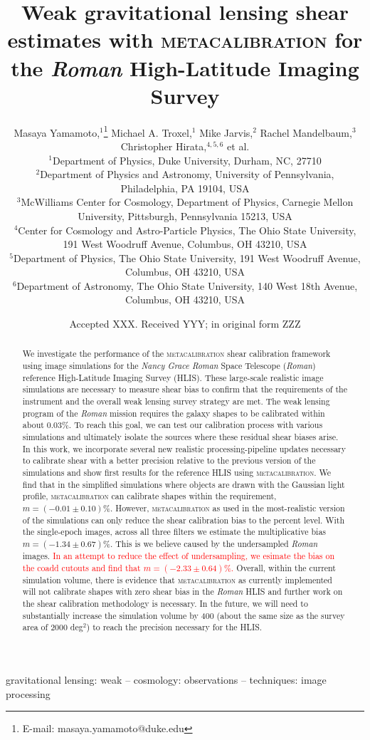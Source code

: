 \documentclass[fleqn,usenatbib]{mnras}
\title[Metacalibration for the Roman High-Latitude Imaging Survey]{Weak gravitational lensing shear estimates with \textsc{metacalibration} for the \emph{Roman} High-Latitude Imaging Survey}
\author[M. Yamamoto et al.]{
Masaya Yamamoto,$^{1}$\thanks{E-mail: masaya.yamamoto@duke.edu}
Michael A. Troxel,$^{1}$
Mike Jarvis,$^{2}$
Rachel Mandelbaum,$^{3}$
Christopher Hirata,$^{4,5,6}$
 et al.\\
$^{1}$Department of Physics, Duke University, Durham, NC, 27710\\
$^{2}$Department of Physics and Astronomy, University of Pennsylvania, Philadelphia, PA 19104, USA\\
$^{3}$McWilliams Center for Cosmology, Department of Physics, Carnegie Mellon University, Pittsburgh, Pennsylvania 15213, USA\\
$^{4}$Center for Cosmology and Astro-Particle Physics, The Ohio State University, 191 West Woodruff Avenue, Columbus, OH 43210, USA\\
$^{5}$Department of Physics, The Ohio State University, 191 West Woodruff Avenue, Columbus, OH 43210, USA\\
$^{6}$Department of Astronomy, The Ohio State University, 140 West 18th Avenue, Columbus, OH 43210, USA\\
}
\date{Accepted XXX. Received YYY; in original form ZZZ}
\begin{document}
\label{firstpage}
\pagerange{\pageref{firstpage}--\pageref{lastpage}}
\maketitle

\begin{abstract}
We investigate the performance of the \textsc{metacalibration} shear calibration framework using image simulations for the \emph{Nancy Grace Roman} Space Telescope (\emph{Roman}) reference High-Latitude Imaging Survey (HLIS). These large-scale realistic image simulations are necessary to measure shear bias to confirm that the requirements of the instrument and the overall weak lensing survey strategy are met. The weak lensing program of the \emph{Roman} mission requires the galaxy shapes to be calibrated within about 0.03\%. To reach this goal, we can test our calibration process with various simulations and ultimately isolate the sources where these residual shear biases arise. In this work, we incorporate several new realistic processing-pipeline updates necessary to calibrate shear with a better precision relative to the previous version of the simulations and show first results for the reference HLIS using \textsc{metacalibration}. We find that in the simplified simulations where objects are drawn with the Gaussian light profile, \textsc{metacalibration} can calibrate shapes within the requirement, $m=(-0.01\pm 0.10)$\%. However, \textsc{metacalibration} as used in the most-realistic version of the simulations can only reduce the shear calibration bias to the percent level. With the single-epoch images, across all three filters we estimate the multiplicative bias $m=(-1.34\pm 0.67)$\%. This is we believe caused by the undersampled \emph{Roman} images. \textcolor{red}{In an attempt to reduce the effect of undersampling, we esimate the bias on the coadd cutouts and find that $m=(-2.33\pm 0.64)$\%.} Overall, within the current simulation volume, there is evidence that \textsc{metacalibration} as currently implemented will not calibrate shapes with zero shear bias in the \emph{Roman} HLIS and further work on the shear calibration methodology is necessary. In the future, we will need to substantially increase the simulation volume by 400 (about the same size as the survey area of 2000 deg$^{2}$) to reach the precision necessary for the HLIS.
\end{abstract}

\begin{keywords}
gravitational lensing: weak -- cosmology: observations -- techniques: image processing
\end{keywords}
\end{document}
